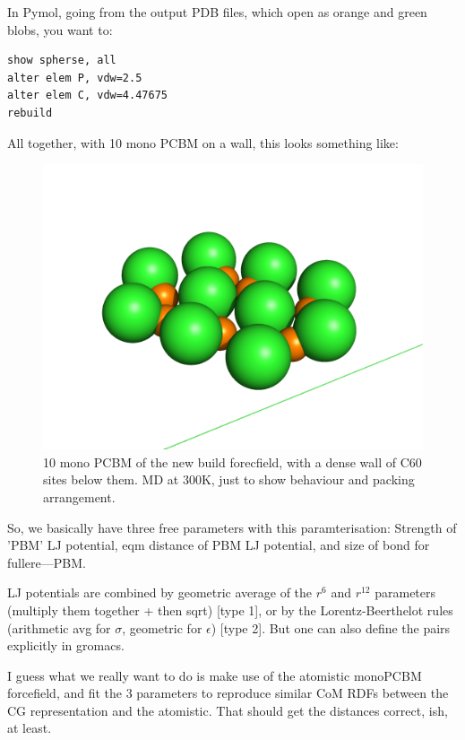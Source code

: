 \documentclass[hyperref]{labbook}
\begin{document}
In Pymol, going from the output PDB files, which open as orange and green blobs, you want to:

\begin{verbatim}
show spherse, all
alter elem P, vdw=2.5
alter elem C, vdw=4.47675
rebuild
\end{verbatim}

All together, with 10 mono PCBM on a wall, this looks something like:

\begin{figure}[h!]
\centering
\includegraphics[width=0.8\columnwidth]{./figs/10_mono_PCBM_stuck_on_wall}
\caption{\label{10_mono_PCBM_stuck_on_wall}
10 mono PCBM of the new build forecfield, with a dense wall of C60 sites below
them. MD at 300K, just to show behaviour and packing arrangement.  }
\end{figure}


So, we basically have three free parameters with this paramterisation: Strength
of 'PBM' LJ potential, eqm distance of PBM LJ potential, and size of bond for
fullere---PBM.

LJ potentials are combined by geometric average of the $r^6$ and $r^{12}$
parameters (multiply them together + then sqrt) [type 1], or by the Lorentz-Beerthelot
rules (arithmetic avg for $\sigma$, geometric for $\epsilon$) [type 2]. 
But one can also
define the pairs explicitly in gromacs.

I guess what we really want to do is make use of the atomistic monoPCBM
forcefield, and fit the 3 parameters to reproduce similar CoM RDFs between the
CG representation and the atomistic. That should get the distances correct, ish, at least.
\end{document}
